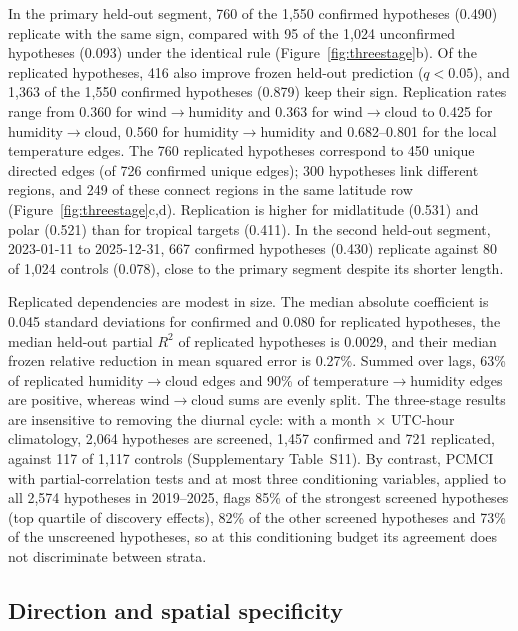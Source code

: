 \documentclass[preprint,12pt]{elsarticle}
\begin{document}
In the primary held-out segment, 760 of the 1,550 confirmed hypotheses (0.490) replicate with the same sign, compared with 95 of the 1,024 unconfirmed hypotheses (0.093) under the identical rule (Figure~\ref{fig:threestage}b). Of the replicated hypotheses, 416 also improve frozen held-out prediction ($q<0.05$), and 1,363 of the 1,550 confirmed hypotheses (0.879) keep their sign. Replication rates range from 0.360 for wind$\rightarrow$humidity and 0.363 for wind$\rightarrow$cloud to 0.425 for humidity$\rightarrow$cloud, 0.560 for humidity$\rightarrow$humidity and 0.682--0.801 for the local temperature edges. The 760 replicated hypotheses correspond to 450 unique directed edges (of 726 confirmed unique edges); 300 hypotheses link different regions, and 249 of these connect regions in the same latitude row (Figure~\ref{fig:threestage}c,d). Replication is higher for midlatitude (0.531) and polar (0.521) than for tropical targets (0.411). In the second held-out segment, 2023-01-11 to 2025-12-31, 667 confirmed hypotheses (0.430) replicate against 80 of 1,024 controls (0.078), close to the primary segment despite its shorter length.

Replicated dependencies are modest in size. The median absolute coefficient is 0.045 standard deviations for confirmed and 0.080 for replicated hypotheses, the median held-out partial $R^2$ of replicated hypotheses is 0.0029, and their median frozen relative reduction in mean squared error is 0.27\%. Summed over lags, 63\% of replicated humidity$\rightarrow$cloud edges and 90\% of temperature$\rightarrow$humidity edges are positive, whereas wind$\rightarrow$cloud sums are evenly split. The three-stage results are insensitive to removing the diurnal cycle: with a month $\times$ UTC-hour climatology, 2,064 hypotheses are screened, 1,457 confirmed and 721 replicated, against 117 of 1,117 controls (Supplementary Table~S11). By contrast, PCMCI with partial-correlation tests and at most three conditioning variables, applied to all 2,574 hypotheses in 2019--2025, flags 85\% of the strongest screened hypotheses (top quartile of discovery effects), 82\% of the other screened hypotheses and 73\% of the unscreened hypotheses, so at this conditioning budget its agreement does not discriminate between strata.

\subsection{Direction and spatial specificity}
\label{subsec:dir_res}
\end{document}
